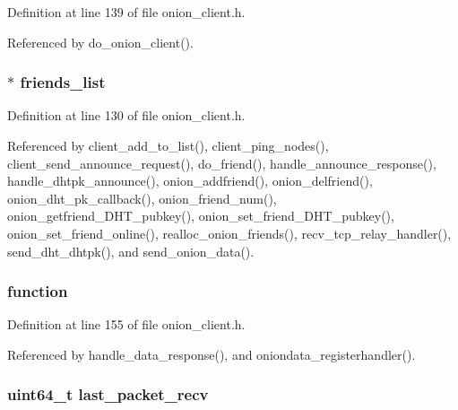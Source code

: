Definition at line 139 of file onion\+\_\+client.\+h.



Referenced by do\+\_\+onion\+\_\+client().

\hypertarget{struct_onion___client_ad2d8940ddd914d8b046938ef4f9d313d}{
\subsubsection[{friends\+\_\+list}]{$\ast$ friends\+\_\+list}}\label{struct_onion___client_ad2d8940ddd914d8b046938ef4f9d313d}


Definition at line 130 of file onion\+\_\+client.\+h.



Referenced by client\+\_\+add\+\_\+to\+\_\+list(), client\+\_\+ping\+\_\+nodes(), client\+\_\+send\+\_\+announce\+\_\+request(), do\+\_\+friend(), handle\+\_\+announce\+\_\+response(), handle\+\_\+dhtpk\+\_\+announce(), onion\+\_\+addfriend(), onion\+\_\+delfriend(), onion\+\_\+dht\+\_\+pk\+\_\+callback(), onion\+\_\+friend\+\_\+num(), onion\+\_\+getfriend\+\_\+\+D\+H\+T\+\_\+pubkey(), onion\+\_\+set\+\_\+friend\+\_\+\+D\+H\+T\+\_\+pubkey(), onion\+\_\+set\+\_\+friend\+\_\+online(), realloc\+\_\+onion\+\_\+friends(), recv\+\_\+tcp\+\_\+relay\+\_\+handler(), send\+\_\+dht\+\_\+dhtpk(), and send\+\_\+onion\+\_\+data().

\hypertarget{struct_onion___client_a016f61b22111ceb83b172007e8135e73}{
\subsubsection[{function}]{ function}}\label{struct_onion___client_a016f61b22111ceb83b172007e8135e73}


Definition at line 155 of file onion\+\_\+client.\+h.



Referenced by handle\+\_\+data\+\_\+response(), and oniondata\+\_\+registerhandler().

\hypertarget{struct_onion___client_ace034948b31137d0ad356f59a3d08af5}{
\subsubsection[{last\+\_\+packet\+\_\+recv}]{\setlength{\rightskip}{0pt plus 5cm}uint64\+\_\+t last\+\_\+packet\+\_\+recv}}\label{struct_onion___client_ace034948b31137d0ad356f59a3d08af5}


